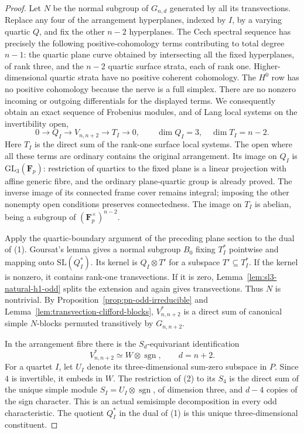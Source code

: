 \begin{proof}
Let $N$ be the normal subgroup of $G_{n,d}$ generated by all its
transvections.  Replace any four of the arrangement hyperplanes,
indexed by $I$, by a varying quartic $Q$, and fix the other
$n-2$ hyperplanes.  The Cech spectral sequence has precisely
the following positive-cohomology terms contributing to total
degree $n-1$:
the quartic plane curve obtained by intersecting all the fixed
hyperplanes, of rank three, and the $n-2$ quartic surface strata,
each of rank one.  Higher-dimensional quartic strata have no
positive coherent cohomology.  The $H^0$ row has no positive
cohomology because the nerve is a full simplex.  There are no
nonzero incoming or outgoing differentials for the displayed
terms.  We consequently obtain an exact sequence of Frobenius
modules, and of Lang local systems on the invertibility open,
\[
 0\longrightarrow Q_I\longrightarrow V_{n,n+2}
      \longrightarrow T_I\longrightarrow0,
 \qquad \dim Q_I=3,\quad\dim T_I=n-2.
 \tag{1}
\]
Here $T_I$ is the direct sum of the rank-one surface local systems.
The open where all these terms are ordinary contains the original
arrangement.  Its image on $Q_I$ is $\mathrm{GL}_3(\mathbf F_p)$:
restriction of quartics to the fixed plane is a linear projection
with affine generic fibre, and the ordinary plane-quartic group
is already proved.  The inverse image of its connected frame
cover remains integral; imposing the other nonempty open
conditions preserves connectedness.  The image on $T_I$ is
abelian, being a subgroup of $(\mathbf F_p^\times)^{n-2}$.

Apply the quartic-boundary argument of the preceding plane
section to the dual of (1).  Goursat's lemma gives a normal
subgroup $B_0$ fixing $T_I^*$ pointwise and mapping onto
$\mathrm{SL}(Q_I^*)$.  Its kernel is
$Q_I\otimes T'$ for a subspace $T'\subseteq T_I^*$.
If the kernel is nonzero, it contains rank-one transvections.
If it is zero, Lemma~\ref{lem:sl3-natural-h1-odd} splits the
extension and again gives transvections.  Thus $N$ is nontrivial.
By Proposition~\ref{prop:pn-odd-irreducible} and
Lemma~\ref{lem:transvection-clifford-blocks}, $V_{n,n+2}^*$ is a
direct sum of canonical simple $N$-blocks permuted transitively
by $G_{n,n+2}$.

In the arrangement fibre there is the $S_d$-equivariant
identification
\[
 V_{n,n+2}^* \simeq W\otimes\operatorname{sgn},
 \qquad d=n+2.
 \tag{2}
\]
For a quartet $I$, let $U_I$ denote its three-dimensional
sum-zero subspace in $P$.  Since $4$ is invertible, it embeds
in $W$.  The restriction of (2) to its $S_4$ is the direct sum
of the unique simple module
$S_I=U_I\otimes\operatorname{sgn}$, of dimension three, and
$d-4$ copies of the sign character.  This is an actual
semisimple decomposition in every odd characteristic.
The quotient $Q_I^*$ in the dual of (1) is this unique
three-dimensional constituent.


\end{proof}
